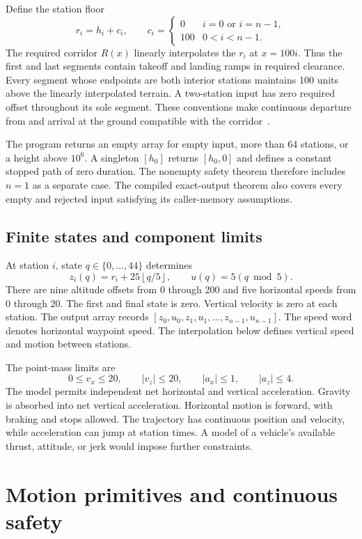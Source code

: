 \documentclass[11pt]{article}
\begin{document}
Define the station floor
\[
 r_i=h_i+c_i,\qquad
 c_i=\begin{cases}0&i=0\text{ or }i=n-1,\\100&0<i<n-1.\end{cases}
\]
The required corridor $R(x)$ linearly interpolates the $r_i$ at $x=100i$.  Thus the first and last segments contain takeoff and landing ramps in required clearance.  Every segment whose endpoints are both interior stations maintains 100 units above the linearly interpolated terrain.  A two-station input has zero required offset throughout its sole segment.  These conventions make continuous departure from and arrival at the ground compatible with the corridor~\cite{drone-source,drone-proofs}.

The program returns an empty array for empty input, more than 64 stations, or a height above $10^6$.  A singleton $[h_0]$ returns $[h_0,0]$ and defines a constant stopped path of zero duration.  The nonempty safety theorem therefore includes $n=1$ as a separate case.  The compiled exact-output theorem also covers every empty and rejected input satisfying its caller-memory assumptions.

\subsection{Finite states and component limits}

At station $i$, state $q\in\{0,\ldots,44\}$ determines
\[
 z_i(q)=r_i+25\left\lfloor q/5\right\rfloor,
 \qquad u(q)=5(q\bmod5).
\]
There are nine altitude offsets from 0 through 200 and five horizontal speeds from 0 through 20.  The first and final state is zero.  Vertical velocity is zero at each station.  The output array records $[z_0,u_0,z_1,u_1,\ldots,z_{n-1},u_{n-1}]$.  The speed word denotes horizontal waypoint speed.  The interpolation below defines vertical speed and motion between stations.

The point-mass limits are
\[
 0\leq v_x\leq20,\qquad |v_z|\leq20,\qquad
 |a_x|\leq1,\qquad |a_z|\leq4.
\]
The model permits independent net horizontal and vertical acceleration.  Gravity is absorbed into net vertical acceleration.  Horizontal motion is forward, with braking and stops allowed.  The trajectory has continuous position and velocity, while acceleration can jump at station times.  A model of a vehicle's available thrust, attitude, or jerk would impose further constraints.

\section{Motion primitives and continuous safety}
\label{sec:primitives}
\end{document}
